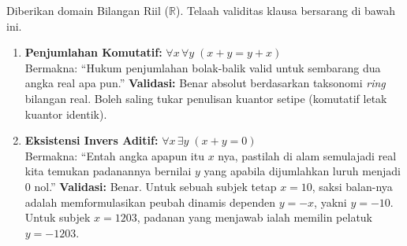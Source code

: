 \begin{contoh}
Diberikan domain Bilangan Riil ($\mathbb{R}$). Telaah validitas klausa bersarang di bawah ini.
\begin{enumerate}
    \item \textbf{Penjumlahan Komutatif:} \quad $\forall x \, \forall y \; (x + y = y + x)$ \\
    Bermakna: ``Hukum penjumlahan bolak-balik valid untuk sembarang dua angka real apa pun.''
    \textbf{Validasi:} Benar absolut berdasarkan taksonomi \textit{ring} bilangan real. Boleh saling tukar penulisan kuantor setipe (komutatif letak kuantor identik).
    
    \item \textbf{Eksistensi Invers Aditif:} \quad $\forall x \, \exists y \; (x + y = 0)$ \\
    Bermakna: ``Entah angka apapun itu $x$ nya, pastilah di alam semulajadi real kita temukan padanannya bernilai $y$ yang apabila dijumlahkan luruh menjadi 0 nol.''
    \textbf{Validasi:} Benar. Untuk sebuah subjek tetap $x=10$, saksi balan-nya adalah memformulasikan peubah dinamis dependen $y = -x$, yakni $y=-10$. Untuk subjek $x=1203$, padanan yang menjawab ialah memilin pelatuk $y=-1203$.
\end{enumerate}
\end{contoh}
